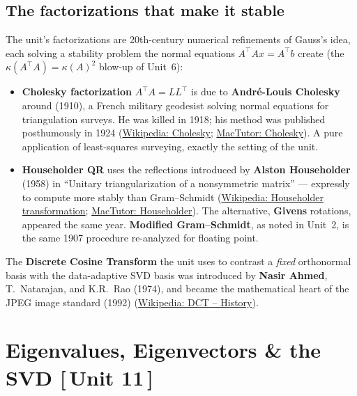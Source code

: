 \documentclass[11pt]{article}
\newcommand{\who}[1]{{\sffamily\bfseries #1}}
\newcommand{\yr}[1]{{\sffamily\color{BrickRed}(#1)}}
\newcommand{\unit}[1]{{\footnotesize\sffamily\color{RoyalBlue}[\,#1\,]}}
\begin{document}
\subsection{The factorizations that make it stable}
The unit's factorizations are 20th-century numerical refinements of Gauss's idea,
each solving a stability problem the normal equations $A^\top A x=A^\top b$ create
(the $\kappa(A^\top A)=\kappa(A)^2$ blow-up of Unit~6):
\begin{itemize}[leftmargin=1.4em,itemsep=2pt]
  \item \who{Cholesky factorization} $A^\top A=LL^\top$ is due to
        \who{Andr\'e-Louis Cholesky} around \yr{1910}, a French military
        geodesist solving normal equations for triangulation surveys. He was
        killed in 1918; his method was published posthumously in 1924
        (\href{https://en.wikipedia.org/wiki/Cholesky_decomposition\#History}{Wikipedia:
        Cholesky};
        \href{https://mathshistory.st-andrews.ac.uk/Biographies/Cholesky/}{MacTutor:
        Cholesky}). A pure application of least-squares surveying, exactly the
        setting of the unit.
  \item \who{Householder QR} uses the reflections introduced by \who{Alston
        Householder} \yr{1958} in ``Unitary triangularization of a nonsymmetric
        matrix'' --- expressly to compute more stably than Gram--Schmidt
        (\href{https://en.wikipedia.org/wiki/Householder_transformation}{Wikipedia:
        Householder transformation};
        \href{https://mathshistory.st-andrews.ac.uk/Biographies/Householder/}{MacTutor:
        Householder}). The alternative, \who{Givens} rotations, appeared the same
        year. \who{Modified Gram--Schmidt}, as noted in Unit~2, is the same 1907
        procedure re-analyzed for floating point.
\end{itemize}
The \who{Discrete Cosine Transform} the unit uses to contrast a \emph{fixed}
orthonormal basis with the data-adaptive SVD basis was introduced by \who{Nasir
Ahmed}, T.\ Natarajan, and K.R.\ Rao \yr{1974}, and became the mathematical heart
of the JPEG image standard \yr{1992}
(\href{https://en.wikipedia.org/wiki/Discrete_cosine_transform\#History}{Wikipedia:
DCT -- History}).

\section{Eigenvalues, Eigenvectors \& the SVD \unit{Unit 11}}
\end{document}

